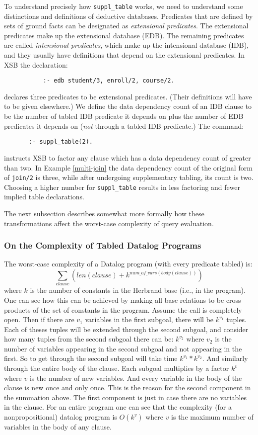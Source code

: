 To understand precisely how \verb|suppl_table| works, we need to
understand some distinctions and definitions of deductive databases.
Predicates that are defined by sets of ground facts can be designated
as {\em extensional predicates}.  The extensional predicates make up
the extensional database (EDB).  The remaining predicates are called
{\em intensional predicates}, which make up the intensional database
(IDB), and they usually have definitions that depend on the
extensional predicates.  In XSB the declaration:
\begin{verbatim}
           :- edb student/3, enroll/2, course/2.
\end{verbatim}
declares three predicates to be extensional predicates.  (Their
definitions will have to be given elsewhere.)  We define the data
dependency count of an IDB clause to be the number of tabled IDB
predicate it depends on plus the number of EDB predicates it depends
on ({\em not} through a tabled IDB predicate.)  The command:
\begin{verbatim}
       :- suppl_table(2).
\end{verbatim}
instructs XSB to factor any clause which has a data dependency count
of greater than two.  In Example \ref{multi-join} the data dependency
count of the original form of {\tt join/2} is three, while after
undergoing supplementary tabling, its count is two.  Choosing a higher
number for \verb|suppl_table| results in less factoring and fewer
implied table declarations.

The next subsection describes somewhat more formally how these
transformations affect the worst-case complexity of query evaluation.

\subsubsection{On the Complexity of Tabled Datalog Programs}

The worst-case complexity of a Datalog program (with every predicate
tabled) is:
\[\sum_{clause} (len(clause) + k^{num\_of\_vars(body(clause))})\]
where $k$ is the number of constants in the Herbrand base (i.e., in
the program).  One can see how this can be achieved by making all base
relations to be cross products of the set of constants in the program.
Assume the call is completely open.  Then if there are $v_1$ variables
in the first subgoal, there will be $k^{v_1}$ tuples.  Each of theses
tuples will be extended through the second subgoal, and consider how
many tuples from the second subgoal there can be: $k^{v_2}$ where
$v_2$ is the number of variables appearing in the second subgoal and
not appearing in the first.  So to get through the second subgoal will
take time $k^{v_1}*k^{v_2}$.  And similarly through the entire body of
the clause.  Each subgoal multiplies by a factor $k^v$ where $v$ is
the number of new variables.  And every variable in the body of the
clause is new once and only once.  This is the reason for the second
component in the summation above.  The first component is just in case
there are no variables in the clause.  For an entire program one can
see that the complexity (for a nonpropositional) datalog program is
$O(k^v)$ where $v$ is the maximum number of variables in the body of
any clause.

